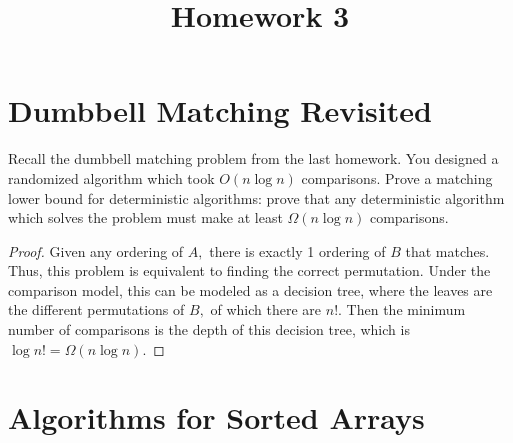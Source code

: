 \documentclass{article}
\begin{document}
\title{Homework 3}
\maketitle
\thispagestyle{fancy}

\section{Dumbbell Matching Revisited}

Recall the dumbbell matching problem from the last homework. You designed a randomized algorithm which took $O(n\log n)$ comparisons. Prove a matching lower bound for deterministic algorithms: prove that any deterministic algorithm which solves the problem must make at least $\Omega(n\log n)$ comparisons.
\begin{proof}
	Given any ordering of $A,$ there is exactly 1 ordering of $B$ that matches. Thus, this problem is equivalent to finding the correct permutation. Under the comparison model, this can be modeled as a decision tree, where the leaves are the different permutations of $B,$ of which there are $n!.$ Then the minimum number of comparisons is the depth of this decision tree, which is $\log n! = \Omega(n\log n).$
\end{proof}

\section{Algorithms for Sorted Arrays}
\end{document}
